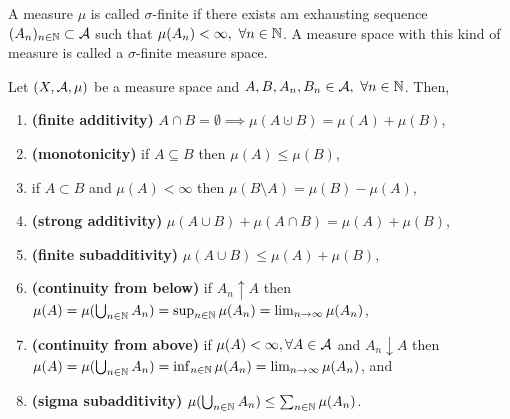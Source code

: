 \newcommand{\sigfin}{$\sigma$-finite }
\begin{dfn}
	A measure $\mu$ is called $\sigma$-finite if there exists am exhausting sequence $(A_n)_{n \in \mathbb{N}} \subset \mathcal{A}$ such that $\mu(A_n) < \infty,\ \forall n \in \mathbb{N}$. A measure space with this kind of measure is called a \sigfin  measure space.
\end{dfn}

\begin{thm}
	Let $(X, \mathcal{A}, \mu)$ be a measure space and $A, B, A_n, B_n \in \mathcal{A},\ \forall n \in \mathbb{N}$. Then,
	\begin{enumerate}
		\item \textbf{(finite additivity)} $A \cap B = \emptyset \implies \mu(A \cupdot B) = \mu(A) + \mu(B)$,
		\item \textbf{(monotonicity)} if $A \subseteq B$ then $\mu(A) \leq \mu(B)$,
		\item if $A \subset B$ and $\mu(A) < \infty$ then $\mu(B\setminus A) = \mu(B) - \mu(A)$,
		\item \textbf{(strong additivity)} $\mu(A \cup B) + \mu(A \cap B) = \mu(A) + \mu(B)$,
		\item \textbf{(finite subadditivity)} $\mu(A \cup B) \leq \mu(A) + \mu(B)$,
		\item \textbf{(continuity from below)} if $A_n \uparrow A$ then $\mu(A) = \mu(\bigcup_{n \in \mathbb{N}} A_n) = \sup_{n\in\mathbb{N}} \mu(A_n) = \lim_{n\to \infty} \mu(A_n)$,
		\item \textbf{(continuity from above)} if $\mu(A) < \infty, \forall A \in \mathcal{A}$ and $A_n \downarrow A$ then $\mu(A) = \mu(\bigcup_{n \in \mathbb{N}} A_n) = \inf_{n\in\mathbb{N}} \mu(A_n) = \lim_{n\to \infty} \mu(A_n)$, and
		\item \textbf{(sigma subadditivity)} $\mu(\bigcup_{n \in \mathbb{N}} A_n) \leq \sum_{n\in \mathbb{N}} \mu(A_n)$.
	\end{enumerate}
\end{thm}

